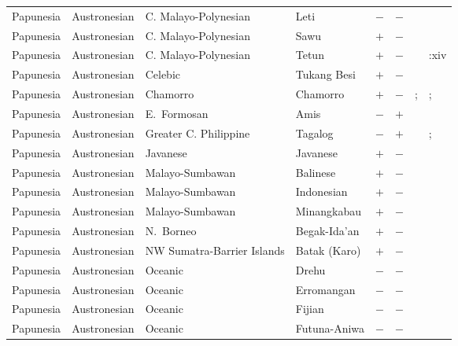 \begin{landscape}
\begin{longtable}{l>{\raggedright\arraybackslash}p{2.2cm}>{\raggedright}p{2.5cm}>{\raggedright\arraybackslash}p{2.5cm}cc>{\raggedright\arraybackslash}p{3.4cm}>{\raggedright\arraybackslash}p{3.4cm}}
Papunesia & Austronesian & C. Malayo-Polynesian & Leti & $-$ & $-$ & \citealt{Gil2013} & \citealt[passim]{Engelenhoven2005}\\
Papunesia & Austronesian & C. Malayo-Polynesian & Sawu & $+$ & $-$ & \citealt{Gil2013} & \citealt{Corbett2013}\\
Papunesia & Austronesian & C. Malayo-Polynesian & Tetun & $+$ & $-$ & \citealt{Gil2013} & \citealt{Morris1984}:xiv\\
Papunesia & Austronesian & Celebic & Tukang Besi & $+$ & $-$ & \citealt{Gil2013} & \citealt{Corbett2013}\\
Papunesia & Austronesian & Chamorro & Chamorro & $+$ & $-$ & \citealt[137, 299]{Nichols1992}; \citealt[164--166]{Topping1973} & \citealt[passim]{Topping1973}; \citealt[299]{Nichols1992}\\
Papunesia & Austronesian & E.~Formosan & Amis & $-$ & $+$ & \citealt{Gil2013} & \citealt[79]{Wu2006}\\
Papunesia & Austronesian & Greater C. Philippine & Tagalog & $-$ & $+$ & \citealt{Gil2013} & \citealt{Corbett2013}; \citealt[197--198]{Schachter1972}\\
Papunesia & Austronesian & Javanese & Javanese & $+$ & $-$ & \citealt{Gil2013} & \citealt[passim]{Oakes2009}\\
Papunesia & Austronesian & Malayo-Sumbawan & Balinese & $+$ & $-$ & \citealt{Gil2013} & \citealt[passim]{Artawa2013}\\
Papunesia & Austronesian & Malayo-Sumbawan & Indonesian & $+$ & $-$ & \citealt{Gil2013} & \citealt{Corbett2013}\\
Papunesia & Austronesian & Malayo-Sumbawan & Minangkabau & $+$ & $-$ & \citealt{Gil2013} & \citealt[60--63]{Crouch2009}\\
Papunesia & Austronesian & N.~Borneo & Begak-Ida'an & $+$ & $-$ & \citealt{Gil2013} & \citealt[88, 101--102]{Goudswaard2005}\\
Papunesia & Austronesian & NW Sumatra-Barrier Islands & Batak (Karo) & $+$ & $-$ & \citealt{Gil2013} & \citealt{Corbett2013}\\
Papunesia & Austronesian & Oceanic & Drehu & $-$ & $-$ & \citealt{Gil2013} & \citealt[299]{Nichols1992}\\
Papunesia & Austronesian & Oceanic & Erromangan & $-$ & $-$ & \citealt{Gil2013} & \citealt{Corbett2013}\\
Papunesia & Austronesian & Oceanic & Fijian & $-$ & $-$ & \citealt{Gil2013} & \citealt{Corbett2013}\\
Papunesia & Austronesian & Oceanic & Futuna-Aniwa & $-$ & $-$ & \citealt{Gil2013} & \citealt[passim]{Dougherty1983}\\

\end{longtable}
\end{landscape}
